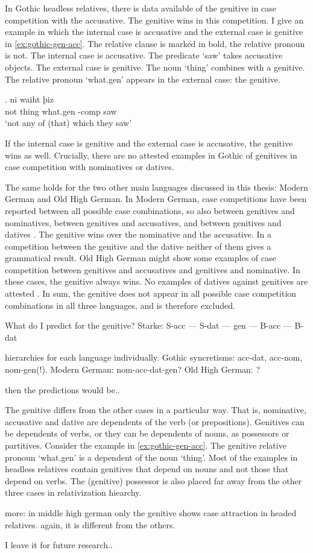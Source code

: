 In Gothic headless relatives, there is data available of the genitive in case competition with the accusative. The genitive wins in this competition.
I give an example in which the internal case is accusative and the external case is genitive in \ref{ex:gothic-gen-acc}.
The relative clause is marked in bold, the relative pronoun is not.
The internal case is accusative. The predicate  `saw' takes accusative objects.
The external case is genitive. The noun  `thing' combines with a genitive.
The relative pronoun  `what.\ac{gen}' appears in the external case: the genitive.

\exg. ni waiht þiz  \\
 not thing\scsub{[gen]} what.\ac{gen} -\ac{comp} saw\scsub{[acc]}\\
 `not any of (that) which they saw' \label{ex:gothic-gen-acc}

If the internal case is genitive and the external case is accusative, the genitive wins as well. Crucially, there are no attested examples in Gothic of genitives in case competition with nominatives or datives.

The same holds for the two other main languages discussed in this thesis: Modern German and Old High German.
In Modern German, case competitions have been reported between all possible case combinations, so also between genitives and nominatives, between genitives and accusatives, and between genitives and datives \citep[cf.][]{vogel2001}. The genitive wins over the nominative and the accusative. In a competition between the genitive and the dative neither of them gives a grammatical result.
Old High German might show some examples of case competition between genitives and accusatives and genitives and nominative. In these cases, the genitive always wins. No examples of datives against genitives are attested \citep{behaghel1923}.
In sum, the genitive does not appear in all possible case competition combinations in all three languages, and is therefore excluded.

What do I predict for the genitive? Starke: S-acc --- S-dat --- gen --- B-acc --- B-dat

hierarchies for each language individually. Gothic syncretisms: acc-dat, acc-nom, nom-gen(!). Modern German: nom-acc-dat-gen? Old High German: ?

then the predictions would be..

The genitive differs from the other cases in a particular way. That is, nominative, accusative and dative are dependents of the verb (or prepositions). Genitives can be dependents of verbs, or they can be dependents of nouns, as possessors or partitives. Consider the example in \ref{ex:gothic-gen-acc}. The genitive relative pronoun  `what.\ac{gen}' is a dependent of the noun  `thing'. Most of the examples in headless relatives contain genitives that depend on nouns and not those that depend on verbs. The (genitive) possessor is also placed far away from the other three cases in  relativization hiearchy.

more: in middle high german only the genitive shows case attraction in headed relatives. again, it is different from the others.

I leave it for future research..
